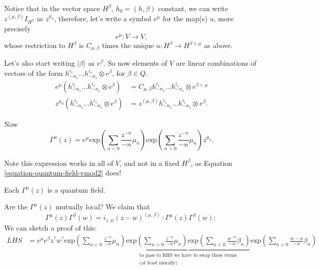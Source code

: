 \medskip\noindent
Notice that in the vector space
$H^\beta$, $h_0=(h,\beta)$ constant, we can
write
$z^{(\mu,\beta)}I_{H^\beta}$ as $z^{\mu_0}$,
therefore, let's write a symbol $e^\mu$ for
the map(s) $u$,
more precisely
$$
e^\mu:V \to V,
$$
whose restriction to $H^\beta$ is
$C_{\mu,\beta}$ times
the unique $u:H^\beta \to H^{\beta+\mu}$ as
above.

Let's also start writing
$|\beta\rangle$ as $e^\beta$.
So now elements of $V$ are linear
combinations
of vectors of the form
$h^{i_1}_{-n_1}\ldots h^{i_s}_{-n_s} \otimes
e^\beta$,
for $\beta \in Q$.
$$
\begin{aligned}
e^\mu(h^{i_1}_{-n_1}\ldots h^{i_s}_{-n_s}
\otimes e^\beta)
&=C_{\mu,\beta} h^{i_1}_{-n_1}\ldots
h^{i_s}_{-n_s}\otimes e^{\beta+\mu}\\
z^{\mu_0}(h^{i_1}_{-n_1}\ldots
h^{i_s}_{-n_s}\otimes e^\beta)
&=z^{(\mu,\beta)}h^{i_1}_{-n_1}\ldots
h^{i_s}_{-n_1} \otimes e^\beta.
\end{aligned}
$$

\noindent
Now
\begin{equation}
\label{equation-quantum-field-vmod3}
\Gamma^\mu(z)=e^\mu
\text{exp}\left(\sum_{n<0}\frac{z^{-n}}{-n}
\mu_n\right)
\text{exp}\left(\sum_{n>0}\frac{z^{-n}}{-n}
\mu_n\right)
z^{\mu_0}.
\end{equation}

\noindent
Note this expression works in all of $V$,
and not in a fixed $H^\beta$, as Equation
\ref{equation-quantum-field-vmod2}
does!

\begin{exercise}
\label{exercise-quantum-field-vmod}
Each $\Gamma^\mu(z)$ is a quantum field.
\end{exercise}

\noindent
Are the $\Gamma^\mu(z)$ mutually local?
We claim that
\begin{equation}
\label{equation-mutually-local-vmode}
\Gamma^\mu(z)\Gamma^\beta(w)=
i_{z,w}(z-w)^{(\mu,\beta)}\,:\!\Gamma^\mu(z)
\Gamma^\beta(w)\!:\,
\end{equation}
We can sketch a proof of this:
$$
\begin{aligned}
LHS&=e^\mu e^\beta z^? w^?
\text{exp}\left(\sum_{n<0}\frac{z^{-n}}{-n}
\mu_n\right)
\underbrace{\text{exp}\left(\sum_{n>0}
\frac{z^{-n}}{-n}\mu_n\right)
\text{exp}\left(\sum_{n<0}\frac{w^{-n}}{-n}
\beta_n\right)
}_{\substack{\text{to pass to RHS we have to
swap these terms}\\
\text{(at least morally)}}}
\text{exp}\left(\sum_{n>0}\frac{w-n}{-n}
\beta_n\right)
\end{aligned}
$$


